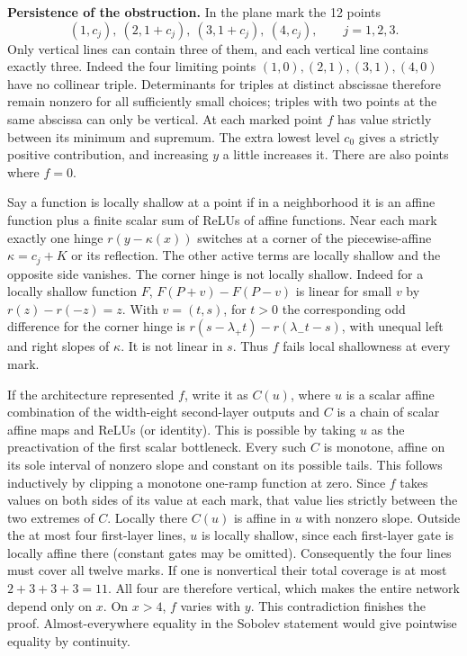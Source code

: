 \documentclass[10pt]{article}
\begin{document}
\textbf{Persistence of the obstruction.} In the plane mark the 12 points
\[
 (1,c_j),\ (2,1+c_j),\ (3,1+c_j),\ (4,c_j),\qquad j=1,2,3 .
\]
Only vertical lines can contain three of them, and each vertical line contains exactly three. Indeed the four limiting points $(1,0),(2,1),(3,1),(4,0)$ have no collinear triple. Determinants for triples at distinct abscissae therefore remain nonzero for all sufficiently small choices; triples with two points at the same abscissa can only be vertical. At each marked point $f$ has value strictly between its minimum and supremum. The extra lowest level $c_0$ gives a strictly positive contribution, and increasing $y$ a little increases it. There are also points where $f=0$.

Say a function is locally shallow at a point if in a neighborhood it is an affine function plus a finite scalar sum of ReLUs of affine functions. Near each mark exactly one hinge $r(y-\kappa(x))$ switches at a corner of the piecewise-affine $\kappa=c_j+K$ or its reflection. The other active terms are locally shallow and the opposite side vanishes. The corner hinge is not locally shallow. Indeed for a locally shallow function $F$, $F(P+v)-F(P-v)$ is linear for small $v$ by $r(z)-r(-z)=z$. With $v=(t,s)$, for $t>0$ the corresponding odd difference for the corner hinge is $r(s-\lambda_+t)-r(\lambda_-t-s)$, with unequal left and right slopes of $\kappa$. It is not linear in $s$. Thus $f$ fails local shallowness at every mark.

If the architecture represented $f$, write it as $C(u)$, where $u$ is a scalar affine combination of the width-eight second-layer outputs and $C$ is a chain of scalar affine maps and ReLUs (or identity). This is possible by taking $u$ as the preactivation of the first scalar bottleneck. Every such $C$ is monotone, affine on its sole interval of nonzero slope and constant on its possible tails. This follows inductively by clipping a monotone one-ramp function at zero. Since $f$ takes values on both sides of its value at each mark, that value lies strictly between the two extremes of $C$. Locally there $C(u)$ is affine in $u$ with nonzero slope. Outside the at most four first-layer lines, $u$ is locally shallow, since each first-layer gate is locally affine there (constant gates may be omitted). Consequently the four lines must cover all twelve marks. If one is nonvertical their total coverage is at most $2+3+3+3=11$. All four are therefore vertical, which makes the entire network depend only on $x$. On $x>4$, $f$ varies with $y$. This contradiction finishes the proof. Almost-everywhere equality in the Sobolev statement would give pointwise equality by continuity.
\end{document}
